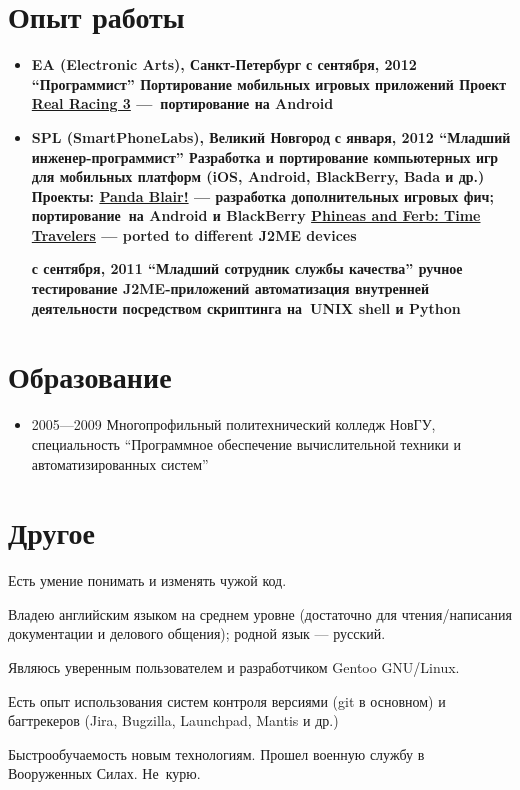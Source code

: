 \section{Опыт работы}
\begin{itemize}
\item {
\fontsize{14pt}{14pt}\selectfont
\bfseries EA (Electronic Arts)\mdseries, Санкт-Петербург
}
\subitem \bfseries с сентября, 2012 ``Программист''\mdseries
\subsubitem Портирование мобильных игровых приложений
\subsubitem Проект \href{http://www.facebook.com/realracing}{Real Racing 3} ---\
портирование на Android

\item {
\fontsize{14pt}{14pt}\selectfont
\bfseries SPL (SmartPhoneLabs)\mdseries, Великий Новгород
}
\subitem \bfseries с января, 2012 ``Младший инженер-программист''\mdseries
\subsubitem Разработка и портирование компьютерных игр для мобильных платформ
(iOS, Android, BlackBerry, Bada и др.)
\subsubitem Проекты:
\subsubitem\href{https://itunes.apple.com/us/app/panda-blair!/id500995558?mt=8}{Panda Blair!} --- разработка дополнительных игровых фич; портирование\
на Android и BlackBerry
\subsubitem\href{http://java.mob.org/game/phineas\_and\_ferb\_time\_travelers.html}{Phineas and Ferb: Time Travelers} --- ported to different J2ME devices

\subitem \bfseries с сентября, 2011 ``Младший сотрудник службы качества''
\mdseries
\subsubitem ручное тестирование J2ME-приложений
\subsubitem автоматизация внутренней деятельности посредством скриптинга на\
UNIX shell и Python
\end{itemize}

\section{Образование}
\begin{itemize}
\item 2005---2009 Многопрофильный политехнический колледж НовГУ, специальность
``Программное обеспечение вычислительной техники и автоматизированных систем''
\end{itemize}

\section{Другое}
Есть умение понимать и изменять чужой код.

Владею английским языком на среднем уровне (достаточно для чтения/написания
документации и делового общения); родной язык --- русский.

Являюсь уверенным пользователем и разработчиком Gentoo GNU/Linux.

Есть опыт использования систем контроля версиями (git в основном) и
багтрекеров (Jira, Bugzilla, Launchpad, Mantis и др.)

Быстрообучаемость новым технологиям.
Прошел военную службу в Вооруженных Силах.
Не~курю.
